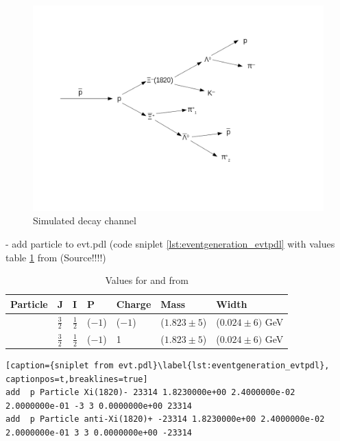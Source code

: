\begin{figure}[htbp]
	\centering
			\includegraphics[width=1.00\textwidth]{./plots/DecayChannelXi1820.png}
	\caption{Simulated decay channel}
	\label{fig:eventgeneration_decaychannel}
\end{figure}

- add particle to evt.pdl (code sniplet \ref{lst:eventgeneration_evtpdl} with values table \ref{tab:eventgeneration_Xivalues} from \cite{PDG} (Source!!!!)

\begin{table}[tb]
	\centering
	\caption{Values for \excitedcascade and \excitedanticascade from \cite{PDG}}
	\label{tab:eventgeneration_Xivalues}
	\begin{tabular}{lllllll}
		\hline
		Particle & J & I & P & Charge & Mass  & Width \\
		\hline
		\hline
		\excitedcascade & $\frac{3}{2}$ & $\frac{1}{2}$ & ($-1$) & ($-1$) & ($1.823 \pm 5$)\massunit & ($0.024 \pm 6) $ GeV \\
		\excitedanticascade & $\frac{3}{2}$ & $\frac{1}{2}$ & ($-1$) & 1 & ($1.823 \pm 5$)\massunit & ($0.024 \pm 6) $ GeV\\
		\hline
		  
	\end{tabular}
\end{table}

\begin{lstlisting}[caption={sniplet from evt.pdl}\label{lst:eventgeneration_evtpdl}, captionpos=t,breaklines=true]
add  p Particle Xi(1820)- 23314 1.8230000e+00 2.4000000e-02 2.0000000e-01 -3 3 0.0000000e+00 23314
add  p Particle anti-Xi(1820)+ -23314 1.8230000e+00 2.4000000e-02 2.0000000e-01 3 3 0.0000000e+00 -23314
\end{lstlisting}

